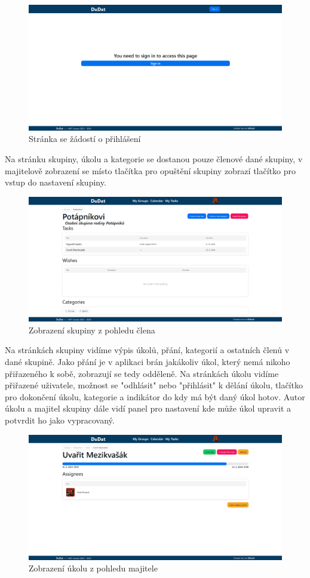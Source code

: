 \begin{figure}[hbt!]
	\centering
	\includegraphics[width=1\linewidth]{img/signIn.png}
	\caption{Stránka se žádostí o přihlášení}
\end{figure}
Na stránku skupiny, úkolu a kategorie se dostanou pouze členové dané skupiny, v majitelově zobrazení se místo tlačítka pro opuštění skupiny zobrazí tlačítko pro vstup do nastavení skupiny.
\begin{figure}[hbt!]
	\centering
	\includegraphics[width=1\linewidth]{img/groupPage.png}
	\caption{Zobrazení skupiny z pohledu člena}
\end{figure}
Na stránkách skupiny vidíme výpis úkolů, přání, kategorií a ostatních členů v dané skupině. Jako přání je v aplikaci brán jakákoliv úkol, který nemá nikoho přiřazeného k sobě, zobrazují se tedy odděleně. Na stránkách úkolu vidíme přiřazené uživatele, možnost se "odhlásit" nebo "přihlásit" k dělání úkolu, tlačítko pro dokončení úkolu, kategorie a indikátor do kdy má být daný úkol hotov. Autor úkolu a majitel skupiny dále vidí panel pro nastavení kde může úkol upravit a potvrdit ho jako vypracovaný.

\begin{figure}[hbt!]
	\centering
	\includegraphics[width=1\linewidth]{img/ukol.png}
	\caption{Zobrazení úkolu z pohledu majitele\cite{mezikvasak}}
\end{figure}


